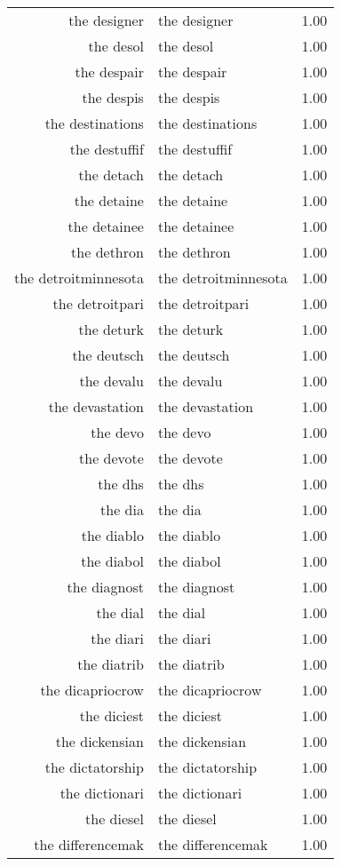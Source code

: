 \begin{table}[ht]
\begin{tabular}{rlr}
  the designer & the designer & 1.00 \\ 
  the desol & the desol & 1.00 \\ 
  the despair & the despair & 1.00 \\ 
  the despis & the despis & 1.00 \\ 
  the destinations & the destinations & 1.00 \\ 
  the destuffif & the destuffif & 1.00 \\ 
  the detach & the detach & 1.00 \\ 
  the detaine & the detaine & 1.00 \\ 
  the detainee & the detainee & 1.00 \\ 
  the dethron & the dethron & 1.00 \\ 
  the detroitminnesota & the detroitminnesota & 1.00 \\ 
  the detroitpari & the detroitpari & 1.00 \\ 
  the deturk & the deturk & 1.00 \\ 
  the deutsch & the deutsch & 1.00 \\ 
  the devalu & the devalu & 1.00 \\ 
  the devastation & the devastation & 1.00 \\ 
  the devo & the devo & 1.00 \\ 
  the devote & the devote & 1.00 \\ 
  the dhs & the dhs & 1.00 \\ 
  the dia & the dia & 1.00 \\ 
  the diablo & the diablo & 1.00 \\ 
  the diabol & the diabol & 1.00 \\ 
  the diagnost & the diagnost & 1.00 \\ 
  the dial & the dial & 1.00 \\ 
  the diari & the diari & 1.00 \\ 
  the diatrib & the diatrib & 1.00 \\ 
  the dicapriocrow & the dicapriocrow & 1.00 \\ 
  the diciest & the diciest & 1.00 \\ 
  the dickensian & the dickensian & 1.00 \\ 
  the dictatorship & the dictatorship & 1.00 \\ 
  the dictionari & the dictionari & 1.00 \\ 
  the diesel & the diesel & 1.00 \\ 
  the differencemak & the differencemak & 1.00 \\ 

\end{tabular}
\end{table}

